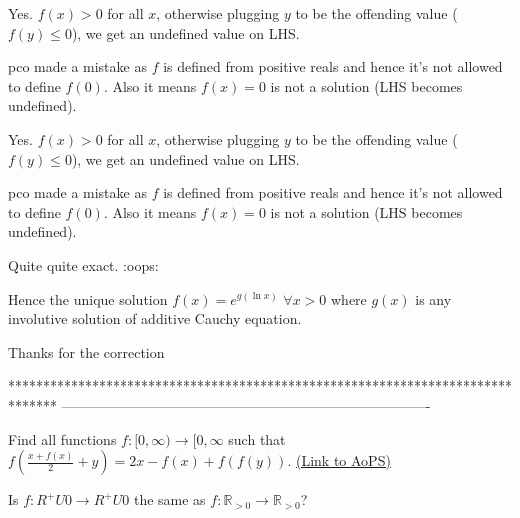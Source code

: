 \begin{solution}
	Yes. $f(x) > 0$ for all $x$, otherwise plugging $y$ to be the offending value ($f(y) \le 0$), we get an undefined value on LHS.

pco made a mistake as $f$ is defined from positive reals and hence it's not allowed to define $f(0)$. Also it means $f(x) = 0$ is not a solution (LHS becomes undefined).
\end{solution}



\begin{solution}
	\begin{tcolorbox}Yes. $f(x) > 0$ for all $x$, otherwise plugging $y$ to be the offending value ($f(y) \le 0$), we get an undefined value on LHS.

pco made a mistake as $f$ is defined from positive reals and hence it's not allowed to define $f(0)$. Also it means $f(x) = 0$ is not a solution (LHS becomes undefined).\end{tcolorbox}
Quite quite exact. :oops:

Hence the unique solution $f(x)=e^{g(\ln x)}$ $\forall x>0$ where $g(x)$ is any involutive solution of additive Cauchy equation.

Thanks for the correction
\end{solution}
*******************************************************************************
-------------------------------------------------------------------------------

\begin{problem}
	Find all functions $f: [0,\infty) \rightarrow [0,\infty $ such that $f\left (\frac{x+f(x)}{2}+y\right )=2x-f(x)+f(f(y))$.
	\flushright \href{https://artofproblemsolving.com/community/c6h491257}{(Link to AoPS)}
\end{problem}



\begin{solution}
	Is $ f: R^{+}U{{0}}\rightarrow R^{+}U{{0}} $ the same as $f:\mathbb{R}_{>0}\to\mathbb{R}_{>0}$?
\end{solution}



